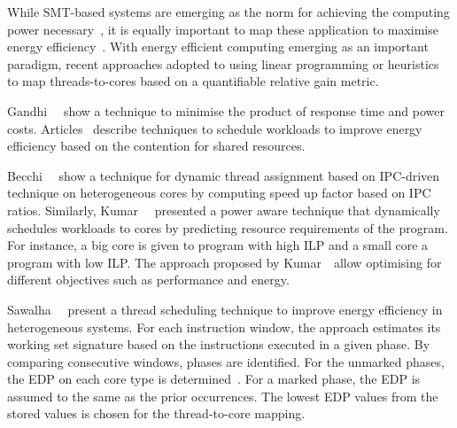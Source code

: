 
While SMT-based \muc systems are emerging as the norm for achieving the computing power
necessary~\citep{7029183, 7459368}, it is equally important to map these application to
maximise energy efficiency~\citep{Petrucci:2015:ETA:2724585.2566618,
Porter:2015:MMS:2695583.2687651}. With energy efficient computing emerging as an important
paradigm, recent approaches adopted to using linear programming or heuristics to map
threads-to-cores based on a quantifiable relative gain metric.


Gandhi~\etal~\citep{Gandhi:2010:OAE:1869138.1869264} show a technique to minimise the
product of response time and power costs.
Articles~\citep{Nishtala:2013:ETC:2555754.2555775, Blagodurov:2010:CSM:1880018.1880019, 
Petrucci:2012:LSE:2387869.2387876} describe techniques to schedule workloads to improve
energy efficiency based on the contention for shared resources. 

Becchi~\etal~\citep{Becchi:2006:DTA:1128022.1128029} show a technique for dynamic
thread assignment based on IPC-driven technique on heterogeneous cores by computing speed
up factor based on IPC ratios.  Similarly,
Kumar~\etal~\citep{Kumar:2003:SHM:956417.956569} presented a power aware technique that
dynamically schedules workloads to cores by predicting resource requirements of the
program. For instance, a big core is given to program with high ILP and a small core a
program with low ILP. The approach proposed by Kumar~\etal~allow optimising for different
objectives such as performance and energy.

Sawalha~\etal~\citep{Cong:2012:ESH:2333660.2333737} present a thread scheduling technique
to improve energy efficiency in heterogeneous \muc systems. For each instruction window,
the approach estimates its working set signature based on the instructions executed in a
given phase. By comparing consecutive windows, phases are identified. For the unmarked
phases, the EDP on each core type is determined~\citep{Petrucci:2012:LSE:2387869.2387876}.
For a marked phase, the EDP is assumed to the same as the prior occurrences. The lowest
EDP values from the stored values is chosen for the thread-to-core mapping.

